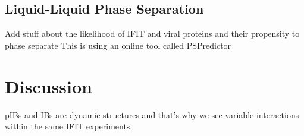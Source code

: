 \subsection{Liquid-Liquid Phase Separation} \label{subsec:Liquid-Liquid Phase Separation-Chapter4}
Add stuff about the likelihood of IFIT and viral proteins and their propensity to phase separate \newline
This is using an online tool called PSPredictor


\section{Discussion} \label{sec:Discussion-Chapter4}
pIBs and IBs are dynamic structures and that’s why we see variable interactions within the same IFIT experiments.